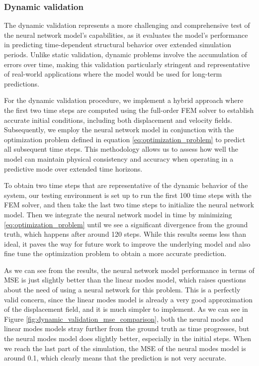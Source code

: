 \subsubsection{Dynamic validation}
\label{sec:dynamic_validation}
The dynamic validation represents a more challenging and comprehensive test of the neural network model's capabilities, as it evaluates the model's performance in predicting time-dependent structural behavior over extended simulation periods. Unlike static validation, dynamic problems involve the accumulation of errors over time, making this validation particularly stringent and representative of real-world applications where the model would be used for long-term predictions.

For the dynamic validation procedure, we implement a hybrid approach where the first two time steps are computed using the full-order FEM solver to establish accurate initial conditions, including both displacement and velocity fields. Subsequently, we employ the neural network model in conjunction with the optimization problem defined in equation \eqref{eq:optimization_problem} to predict all subsequent time steps. This methodology allows us to assess how well the model can maintain physical consistency and accuracy when operating in a predictive mode over extended time horizons.

To obtain two time steps that are representative of the dynamic behavior of the system, our testing environment is set up to run the first 100 time steps with the FEM solver, and then take the last two time steps to initialize the neural network model. Then we integrate the neural network model in time by minimizing \eqref{eq:optimization_problem} until we see a significant divergence from the ground truth, which happens after around 120 steps. While this results seems less than ideal, it paves the way for future work to improve the underlying model and also fine tune the optimization problem to obtain a more accurate prediction.

As we can see from the  results, the neural network model performance in terms of MSE is just slightly better than the linear modes model, which raises questions about the need of  using a neural network for this problem. This is a perfectly valid concern, since the linear modes model is already a very good approximation of the displacement field, and it is much simpler to implement. As we can see in Figure \ref{fig:dynamic_validation_mse_comparison}, both the neural modes and linear modes models stray further from the ground truth as time progresses, but the neural modes model does slightly better, especially in the initial steps. When we reach the last part of the simulation, the MSE of the neural modes model is around 0.1, which clearly means that the prediction is not very accurate.

